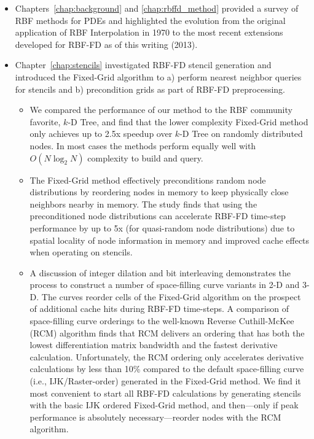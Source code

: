 \begin{itemize}
\item Chapters~\ref{chap:background} and \ref{chap:rbffd_method} provided a survey of RBF methods for PDEs and highlighted the evolution from the original application of RBF Interpolation in 1970 to the most recent extensions developed for RBF-FD as of this writing (2013). 

\item Chapter~\ref{chap:stencils} investigated RBF-FD stencil generation and introduced the Fixed-Grid algorithm to a) perform nearest neighbor queries for stencils and b) precondition grids as part of RBF-FD preprocessing. 
\begin{itemize} 
\item We compared the performance of our method to the RBF community favorite, $k$-D Tree, and find that the lower complexity Fixed-Grid method only achieves up to 2.5x speedup over $k$-D Tree on randomly distributed nodes. In most cases the methods perform equally well with $O(N \log_2 N)$ complexity to build and query.
\item The Fixed-Grid method effectively preconditions random node distributions by reordering nodes in memory to keep physically close neighbors nearby in memory. The study finds that using the preconditioned node distributions can accelerate RBF-FD time-step performance by up to 5x (for quasi-random node distributions) due to spatial locality of node information in memory and improved cache effects when operating on stencils. 
\item A discussion of integer dilation and bit interleaving demonstrates the process to construct a number of space-filling curve variants in 2-D and 3-D. The curves reorder cells of the Fixed-Grid algorithm on the prospect of additional cache hits during RBF-FD time-steps. A comparison of space-filling curve orderings to the well-known Reverse Cuthill-McKee (RCM) algorithm finds that RCM delivers an ordering that has both the lowest differentiation matrix bandwidth and the fastest derivative calculation. Unfortunately, the RCM ordering only accelerates derivative calculations by less than 10\% compared to the default space-filling curve (i.e., IJK/Raster-order) generated in the Fixed-Grid method. We find it most convenient to start all RBF-FD calculations by generating stencils with the basic IJK ordered Fixed-Grid method, and then---only if peak performance is absolutely necessary---reorder nodes with the RCM algorithm. 
\end{itemize} 





\end{itemize}
